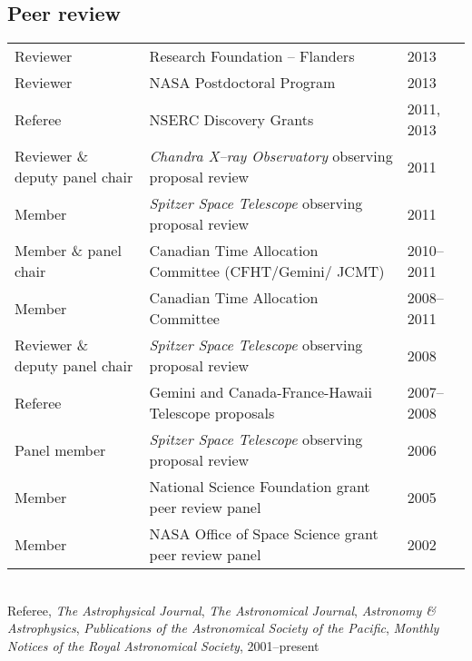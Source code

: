 \documentclass[12pt]{article}
\begin{document}
\subsection{Peer review}
\begin{tabular}{p{2cm}ll}
Reviewer& Research Foundation -- Flanders& 2013\\
Reviewer& NASA Postdoctoral Program& 2013\\
Referee& NSERC Discovery Grants& 2011, 2013\\
Reviewer \& deputy panel chair& {\it Chandra X--ray Observatory\/} observing proposal review& 2011\\
Member& {\it Spitzer Space Telescope\/} observing proposal review& 2011\\
Member \& panel chair& Canadian Time Allocation Committee (CFHT/Gemini/ JCMT)& 2010--2011\\
Member& Canadian Time Allocation Committee& 2008--2011\\
Reviewer \& deputy panel chair& {\it Spitzer Space Telescope\/} observing proposal review& 2008\\
Referee& Gemini and Canada-France-Hawaii Telescope proposals& 2007--2008\\
Panel member& {\it Spitzer Space Telescope\/} observing proposal review& 2006\\
Member& National Science Foundation grant peer review panel& 2005\\
Member& NASA Office of Space Science grant peer review panel& 2002\\
\end{tabular}\\
Referee, {\it The Astrophysical Journal}, {\it The Astronomical Journal}, {\it Astronomy \& Astrophysics},
{\it Publications of the Astronomical Society of the Pacific}, {\it Monthly Notices of the Royal Astronomical Society},
2001--present
\end{document}
